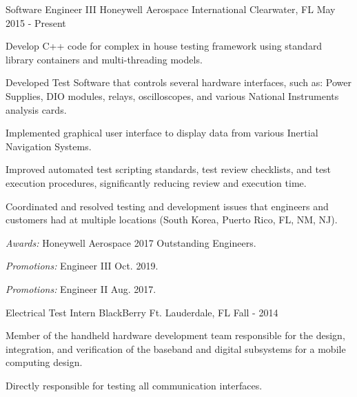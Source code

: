 

\begin{cventries}

  \cventry
    {Software Engineer III} %
    {Honeywell Aerospace International} %
    {Clearwater, FL} %
    {May 2015 - Present} %
    {
      \begin{cvitems} %
        \item {Develop C++ code for complex in house testing framework using standard library containers and multi-threading models.}
				\item {Developed Test Software that controls several hardware interfaces, such as: Power Supplies, DIO modules, relays, oscilloscopes, and various National Instruments analysis cards.}
        \item {Implemented graphical user interface to display data from various Inertial Navigation Systems.}
				\item {Improved automated test scripting standards, test review checklists, and test execution procedures, significantly reducing review and execution time.}
        \item {Coordinated and resolved testing and development issues that engineers and customers had at multiple locations (South Korea, Puerto Rico, FL, NM, NJ).}
				\item {{\it Awards:} Honeywell Aerospace 2017 Outstanding Engineers.}
				\item {{\it Promotions:} Engineer III Oct. 2019.}
				\item {{\it Promotions:} Engineer II Aug. 2017.}
      \end{cvitems}
    }

	\cventry
		{Electrical Test Intern} %
		{BlackBerry} %
		{Ft. Lauderdale, FL} %
		{Fall - 2014} %
		{
			\begin{cvitems} %
			\item {Member of the handheld hardware development team responsible for the design, integration, and verification of the baseband and digital subsystems for a mobile computing design.}
			\item {Directly responsible for testing all communication interfaces.}
			\end{cvitems}
		}
\end{cventries}

